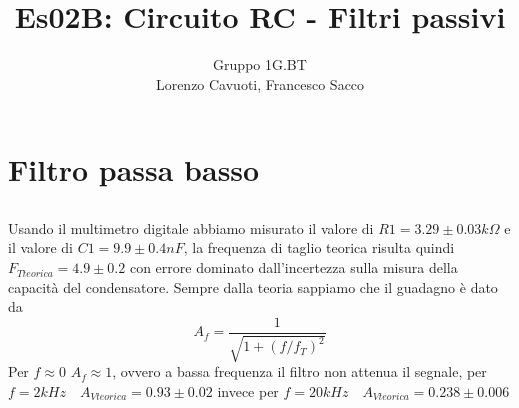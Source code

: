\documentclass[10pt,a4paper]{article}
\author{Gruppo 1G.BT \\ Lorenzo Cavuoti, Francesco Sacco}
\title{Es02B: Circuito RC - Filtri passivi}
\begin{document}
\maketitle

\newcommand{\Vin}{\frac{1}{j\omega C}}

\section{Filtro passa basso}
\subsection{}
Usando il multimetro digitale abbiamo misurato il valore di $R1=3.29\pm 0.03 k\Omega$
e il valore di $C1=9.9\pm 0.4 nF$, la frequenza di taglio teorica risulta quindi
$F_{Tteorica}=4.9\pm 0.2$ con errore dominato dall'incertezza sulla misura della
capacità del condensatore. Sempre dalla teoria sappiamo che il guadagno è dato da
\begin{equation}
	A_f = \frac{1}{\sqrt{1+(f/f_T)^2}}
\end{equation}
Per $f\approx0$ $A_f\approx1$, ovvero a bassa frequenza il filtro non attenua 	il segnale, per $f=2kHz \quad A_{Vteorica}=0.93\pm0.02$ invece per $f=20kHz \quad A_{Vteorica}=0.238\pm0.006$
\end{document}
